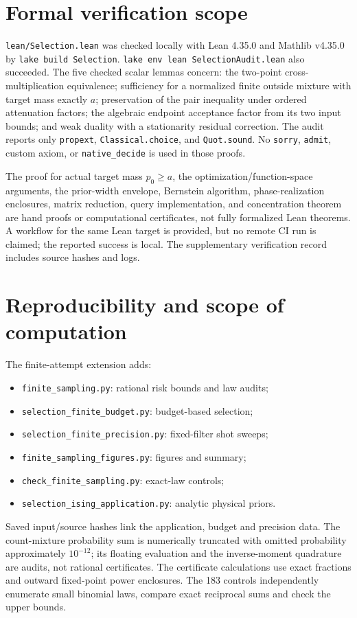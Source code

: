 \section{Formal verification scope}
\texttt{lean/Selection.lean} was checked locally with Lean 4.35.0 and
Mathlib v4.35.0 by \texttt{lake build Selection}.
\texttt{lake env lean SelectionAudit.lean} also succeeded.
The five checked scalar lemmas concern: the two-point cross-multiplication
equivalence; sufficiency for a normalized finite outside mixture with
target mass exactly $a$; preservation of the pair inequality under ordered
attenuation factors; the algebraic endpoint acceptance factor from its
two input bounds; and weak duality with a stationarity residual correction.
The audit reports only \texttt{propext}, \texttt{Classical.choice}, and
\texttt{Quot.sound}. No \texttt{sorry}, \texttt{admit}, custom axiom, or
\texttt{native\_decide} is used in those proofs.

The proof for actual target mass $p_0\geq a$, the optimization/function-space
arguments, the prior-width envelope, Bernstein algorithm, phase-realization
enclosures, matrix reduction, query implementation, and concentration
theorem are hand proofs or computational certificates, not fully formalized
Lean theorems. A workflow for the same Lean target is provided, but no
remote CI run is claimed; the reported success is local. The supplementary
verification record includes source hashes and logs.

\section{Reproducibility and scope of computation}
The finite-attempt extension adds:
\begin{itemize}
\item \texttt{finite\_sampling.py}: rational risk bounds and law audits;
\item \texttt{selection\_finite\_budget.py}: budget-based selection;
\item \texttt{selection\_finite\_precision.py}: fixed-filter shot sweeps;
\item \texttt{finite\_sampling\_figures.py}: figures and summary;
\item \texttt{check\_finite\_sampling.py}: exact-law controls;
\item \texttt{selection\_ising\_application.py}: analytic physical priors.
\end{itemize}
Saved input/source hashes link the application, budget and precision data.
The count-mixture probability sum is numerically truncated with omitted
probability approximately $10^{-12}$; its floating evaluation and the
inverse-moment quadrature are audits, not rational certificates.
The certificate calculations use exact fractions and outward fixed-point
power enclosures. The 183 controls independently enumerate small binomial
laws, compare exact reciprocal sums and check the upper bounds.


